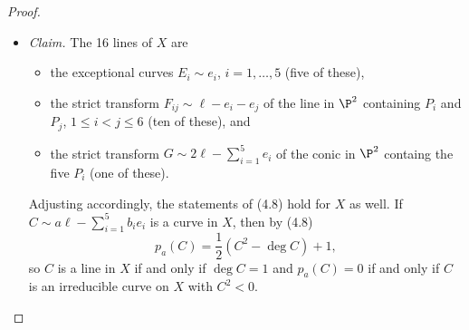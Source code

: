 \documentclass[a4paper]{article}
\begin{document}
\begin{enumerate} [label=\textbf{\arabic*.}, leftmargin=0em]
            \begin{proof} $ $ \vspace{0pt}
                  \begin{itemize} [leftmargin=0cm]
                        \item[(a)]
                              \textit{Claim.} The 16 lines of $X$ are
                              \begin{itemize}
                                    \item[(i)] the exceptional curves $E_i \sim e_i$, $i = 1, \dots, 5$ (five of these),
                                    \item[(ii)] the strict transform $F_{ij} \sim \ell - e_i - e_j$ of the line in $\P^2$ containing $P_i$ and $P_j$, $1 \leq i < j \leq 6$ (ten of these), and
                                    \item[(iii)] the strict transform $G \sim 2\ell - \sum_{i = 1}^5 e_i$ of the conic in $\P^2$ containg the five $P_i$ (one of these).
                              \end{itemize}
                              Adjusting accordingly, the statements of (4.8) hold for $X$ as well.
                              If $C \sim a\ell - \sum_{i =1 }^5 b_i e_i$ is a curve in $X$, then by (4.8)
                              \begin{equation*}
                                    p_a(C) = \frac{1}{2}(C^2 - \deg{C}) + 1,
                              \end{equation*}
                              so $C$ is a line in $X$ if and only if $\deg{C} = 1$ and $p_a(C) = 0$ if and only if $C$ is an irreducible curve on $X$ with $C^2 < 0$.


\end{itemize}
\end{proof}
\end{enumerate}
\end{document}

